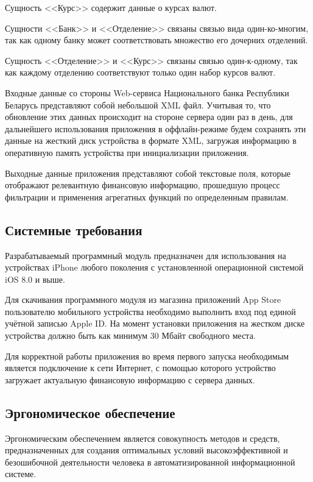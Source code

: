 Сущность <<Курс>> содержит данные о курсах валют.

Сущности <<Банк>> и <<Отделение>> связаны связью
вида один-ко-многим, так как одному банку может соответствовать
множество его дочерних отделений.

Сущность <<Отделение>> и <<Курс>> связаны связью один-к-одному,
так как каждому отделению соответствуют только один набор курсов валют.

Входные данные со стороны Web-сервиса Национального банка Республики Беларусь
представляют собой небольшой XML файл. Учитывая то, что обновление этих данных
происходит на стороне сервера один раз в день, для дальнейшего использования
приложения в оффлайн-режиме будем сохранять эти данные на жесткий
диск устройства в формате XML, загружая информацию в оперативную память
устройства при инициализации приложения.

Выходные данные приложения представляют собой текстовые поля, которые
отображают релевантную финансовую информацию, прошедшую процесс фильтрации
и применения агрегатных функций по определенным правилам.



\subsection{Системные требования}

Разрабатываемый программный модуль предназначен для использования на устройствах
iPhone любого поколения с установленной операционной системой iOS 8.0 и выше.

Для скачивания программного модуля из магазина приложений
App Store пользователю мобильного устройства необходимо выполнить
вход под единой учётной записью Apple ID. На момент установки приложения на
жестком диске устройства должно быть как минимум 30 Мбайт свободного места.

Для корректной работы приложения во время первого запуска необходимым является
подключение к сети Интернет, с помощью которого устройство загружает актуальную
финансовую информацию с сервера данных.



\subsection{Эргономическое обеспечение}

Эргономическим обеспечением является совокупность методов и средств,
предназначенных для создания оптимальных условий высокоэффективной и
безошибочной деятельности человека в автоматизированной информационной системе.

